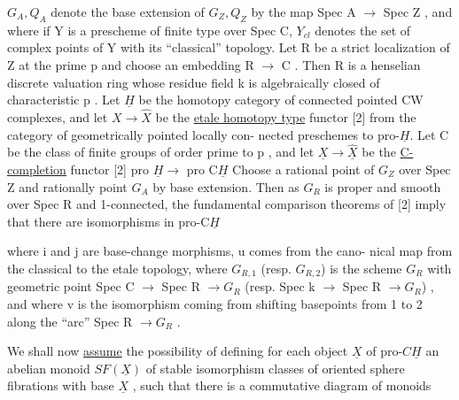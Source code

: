 $G_A,Q_A$ denote the base extension of $G_Z,Q_Z$ by the map Spec A $\to$
Spec Z , and where if Y is a prescheme of finite type over Spec C,
$Y_{cl}$ denotes the set of complex points of Y with its ``classical''
topology. Let R be a strict localization of Z at the prime p
and choose an embedding R $\to$ C . Then R is a henselian discrete
valuation ring whose residue field k is algebraically closed of
characteristic p . Let $\underline{H}$ be the homotopy category of connected
pointed CW complexes, and let $X \to \hat{X}$ be the \uline{etale homotopy type}
functor [2] from the category of geometrically pointed locally con-%
nected preschemes to pro-$\underline{H}$. Let C be the class of finite groups
of order prime to p , and let $\underline{X} \to \hat{\underline{X}}$ be the \uline{C-completion} functor
[2] pro $\underline{H} \to$ pro C$\underline{H}$  Choose a rational point of $G_Z$ over Spec Z
and rationally point $G_A$ by base extension. Then as $G_R$ is proper
and smooth over Spec R and 1-connected, the fundamental comparison
theorems of [2] imply that there are isomorphisms in pro-C$\underline{H}$


where i and j are base-change morphisms, u comes from the cano-%
nical map from the classical to the etale topology, where $G_{R,1}$
(resp. $G_{R,2}$) is the scheme $G_R$ with geometric point Spec C $\to$
Spec R $\to G_R$ (resp. Spec k $\to$ Spec R $\to G_R$) , and where v is the
isomorphism coming from shifting basepoints from 1 to 2 along the
``arc'' Spec R $\to G_R$ .



We shall now \uline{assume}  the possibility of defining
for each object $\underline{X}$ of pro-$C\underline H$ an abelian monoid $SF(\underline{X})$ of stable
isomorphism classes of oriented sphere fibrations with base $\underline{X}$ ,
such that there is a commutative diagram of monoids

